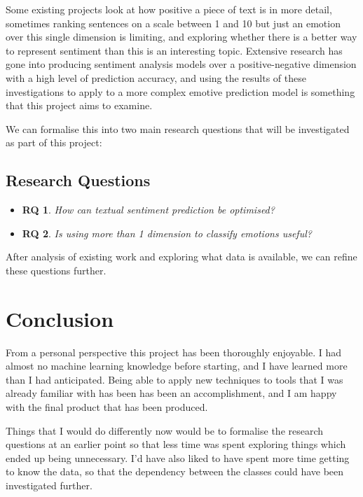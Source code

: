\documentclass[11pt]{article}
\newtheorem{theorem}{RQ}
\begin{document}
Some existing projects look at how positive a piece of text is in more detail, sometimes ranking sentences on a scale between 1 and 10 but just an emotion over this single dimension is limiting, and exploring whether there is a better way to represent sentiment than this is an interesting topic.
Extensive research has gone into producing sentiment analysis models over a positive-negative dimension with a high level of prediction accuracy, and using the results of these investigations to apply to a more complex emotive prediction model is something that this project aims to examine.

We can formalise this into two main research questions that will be investigated as part of this project:

\subsection{Research Questions}


\begin{itemize}
    \item   \begin{theorem} 
                \label{RQ1}
                \textnormal{How can textual sentiment prediction be optimised?}
            \end{theorem}   
    \item   \begin{theorem} 
                \label{RQ2}
                \textnormal{Is using more than 1 dimension to classify emotions useful?}
            \end{theorem} 
\end{itemize}

After analysis of existing work and exploring what data is available, we can refine these questions further. 

\pagebreak


\section{Conclusion}

From a personal perspective this project has been thoroughly enjoyable. I had almost no machine learning knowledge before starting, and I have learned more than I had anticipated. Being able to apply new techniques to tools that I was already familiar with has been has been an accomplishment, and I am happy with the final product that has been produced. 

Things that I would do differently now would be to formalise the research questions at an earlier point so that less time was spent exploring things which ended up being unnecessary. I'd have also liked to have spent more time getting to know the data, so that the dependency between the classes could have been investigated further. 
\end{document}
